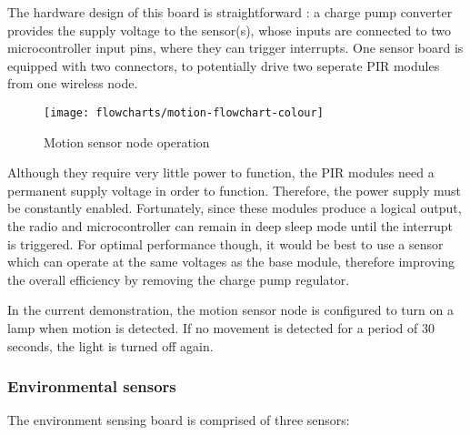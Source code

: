 The hardware design of this board is straightforward : a charge pump converter
provides the supply voltage to the sensor(s), whose inputs are connected to two
microcontroller input pins, where they can trigger interrupts. One sensor board
is equipped with two connectors, to potentially drive two seperate PIR modules
from one wireless node.


\begin{figure}[!h]
  \begin{center}
    \texttt{[image: flowcharts/motion-flowchart-colour]}
  \end{center}
  \caption{Motion sensor node operation}
  \label{fig:motion-flowchart}
\end{figure}

Although they require very little power to function, the PIR modules need a
permanent supply voltage in order to function. Therefore, the power supply must
be constantly enabled. Fortunately, since these modules produce a logical
output, the radio and microcontroller can remain in deep sleep mode until the
interrupt is triggered. For optimal performance though, it would be best to use
a sensor which can operate at the same voltages as the base module, therefore
improving the overall efficiency by removing the charge pump regulator.


In the current demonstration, the motion sensor node is configured to turn on a
lamp when motion is detected. If no movement is detected for a period of 30
seconds, the light is turned off again.


\subsubsection{Environmental sensors}

The environment sensing board is comprised of three sensors:



